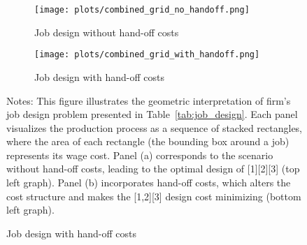 \documentclass{article}
\theoremstyle{plain}
\theoremstyle{plain}
\begin{document}
\begin{figure}[htbp]
  \begin{center}
  \caption{Geometric interpretation of job designs for the \(\tau=3\) tasks example} \label{fig:job_design}
  \begin{subfigure}[b]{0.93\textwidth}
    \texttt{[image: plots/combined\_grid\_no\_handoff.png]}
    \caption{Job design without hand-off costs}
  \end{subfigure}
  \hfill
  \begin{subfigure}[b]{0.93\textwidth}
    \texttt{[image: plots/combined\_grid\_with\_handoff.png]}
    \caption{Job design with hand-off costs}
  \end{subfigure}
  \end{center}
  \footnotesize{Notes: This figure illustrates the geometric interpretation of firm's job design problem presented in Table~\ref{tab:job_design}. Each panel visualizes the production process as a sequence of stacked rectangles, where the area of each rectangle (the bounding box around a job) represents its wage cost. Panel (a) corresponds to the scenario without hand-off costs, leading to the optimal design of [1][2][3] (top left graph). Panel (b) incorporates hand-off costs, which alters the cost structure and makes the [1,2][3] design cost minimizing (bottom left graph).}
\end{figure}


\end{document}
